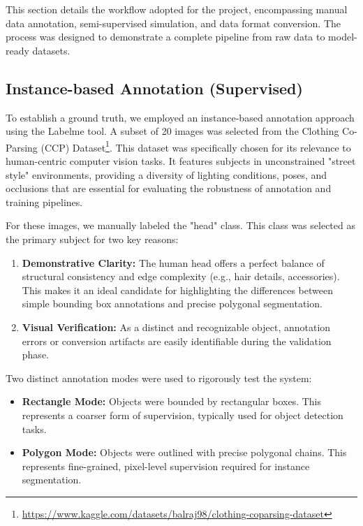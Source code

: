 \documentclass[conference]{IEEEtran}
\begin{document}
This section details the workflow adopted for the project, encompassing manual
data annotation, semi-supervised simulation, and data format conversion. The
process was designed to demonstrate a complete pipeline from raw data to
model-ready datasets.

\subsection{Instance-based Annotation (Supervised)}

To establish a ground truth, we employed an instance-based annotation approach
using the Labelme tool. A subset of 20 images was selected from the Clothing
Co-Parsing (CCP) Dataset\footnote{\url{https://www.kaggle.com/datasets/balraj98/clothing-coparsing-dataset}}.
This dataset was specifically chosen for its relevance to human-centric
computer vision tasks. It features subjects in unconstrained "street style"
environments, providing a diversity of lighting conditions, poses, and
occlusions that are essential for evaluating the robustness of annotation and
training pipelines.

For these images, we manually labeled the "head" class. This class was selected
as the primary subject for two key reasons:

\begin{enumerate}

    \item \textbf{Demonstrative Clarity:} The human head offers a perfect
	    balance of structural consistency and edge complexity (e.g., hair
		details, accessories). This makes it an ideal candidate for
		highlighting the differences between simple bounding box
		annotations and precise polygonal segmentation.

	\item \textbf{Visual Verification:} As a distinct and recognizable
		object, annotation errors or conversion artifacts are easily
		identifiable during the validation phase.

\end{enumerate}

Two distinct annotation modes were used to rigorously test the system:

\begin{itemize}

    \item \textbf{Rectangle Mode:} Objects were bounded by rectangular boxes.
	    This represents a coarser form of supervision, typically used for
		object detection tasks.

	\item \textbf{Polygon Mode:} Objects were outlined with precise
		polygonal chains. This represents fine-grained, pixel-level
		supervision required for instance segmentation.

\end{itemize}
\end{document}
